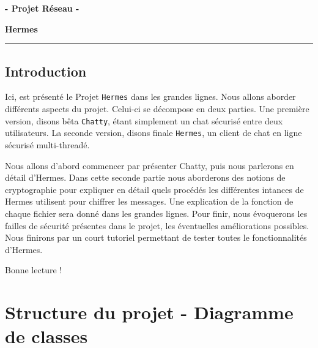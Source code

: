 \documentclass{article}
\begin{document}


\begin{center}
    \textbf{ - Projet Réseau - }

    \Large{\textbf{Hermes}}
\end{center}

\rule{\linewidth}{1.5pt}



\justify

\subsection{Introduction}

Ici, est présenté le Projet \texttt{Hermes} dans les grandes lignes. Nous allons aborder différents aspects du projet. 
Celui-ci se décompose en deux parties. Une première version, disons bêta \texttt{Chatty}, étant simplement un chat sécurisé entre deux utilisateurs. 
La seconde version, disons finale \texttt{Hermes}, un client de chat en ligne sécurisé multi-threadé. 

Nous allons d'abord commencer par présenter Chatty, puis nous parlerons en détail d'Hermes. 
Dans cette seconde partie nous aborderons des notions de cryptographie pour expliquer en détail quels procédés les différentes 
intances de Hermes utilisent pour chiffrer les messages. Une explication de la fonction de chaque fichier sera donné dans les grandes lignes. 
Pour finir, nous évoquerons les failles de sécurité présentes dans le projet, les éventuelles améliorations possibles. 
Nous finirons par un court tutoriel permettant de tester toutes le fonctionnalités d'Hermes. 

\vspace{0.5cm}

Bonne lecture !

\section{Structure du projet - Diagramme de classes}
\end{document}

